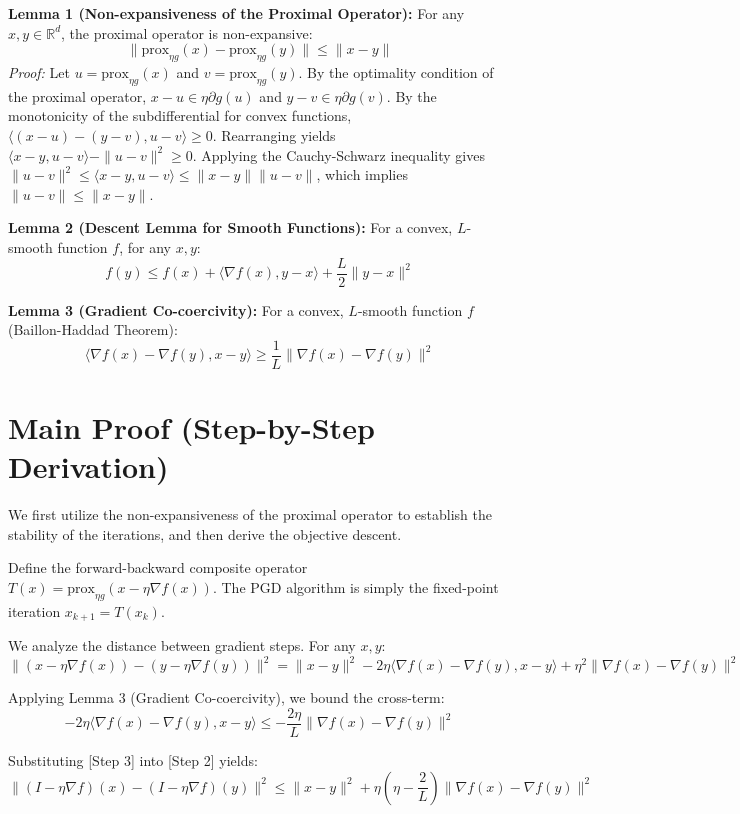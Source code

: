 \documentclass[11pt]{article}
\begin{document}
\textbf{Lemma 1 (Non-expansiveness of the Proximal Operator):} For any $x, y \in \mathbb{R}^d$, the proximal operator is non-expansive:
$$\|\text{prox}_{\eta g}(x) - \text{prox}_{\eta g}(y)\| \le \|x - y\|$$
\textit{Proof:} Let $u = \text{prox}_{\eta g}(x)$ and $v = \text{prox}_{\eta g}(y)$. By the optimality condition of the proximal operator, $x - u \in \eta \partial g(u)$ and $y - v \in \eta \partial g(v)$. By the monotonicity of the subdifferential for convex functions, $\langle (x - u) - (y - v), u - v \rangle \ge 0$. Rearranging yields $\langle x - y, u - v \rangle - \|u - v\|^2 \ge 0$. Applying the Cauchy-Schwarz inequality gives $\|u - v\|^2 \le \langle x - y, u - v \rangle \le \|x - y\| \|u - v\|$, which implies $\|u - v\| \le \|x - y\|$.

\textbf{Lemma 2 (Descent Lemma for Smooth Functions):} For a convex, $L$-smooth function $f$, for any $x, y$:
$$f(y) \le f(x) + \langle \nabla f(x), y - x \rangle + \frac{L}{2}\|y - x\|^2$$

\textbf{Lemma 3 (Gradient Co-coercivity):} For a convex, $L$-smooth function $f$ (Baillon-Haddad Theorem):
$$\langle \nabla f(x) - \nabla f(y), x - y \rangle \ge \frac{1}{L}\|\nabla f(x) - \nabla f(y)\|^2$$

\section*{Main Proof (Step-by-Step Derivation)}

We first utilize the non-expansiveness of the proximal operator to establish the stability of the iterations, and then derive the objective descent.

\noindent [Step 1] Define the forward-backward composite operator $T(x) = \text{prox}_{\eta g}(x - \eta \nabla f(x))$. The PGD algorithm is simply the fixed-point iteration $x_{k+1} = T(x_k)$.

\noindent [Step 2] We analyze the distance between gradient steps. For any $x, y$:
$$\|(x - \eta \nabla f(x)) - (y - \eta \nabla f(y))\|^2 = \|x - y\|^2 - 2\eta \langle \nabla f(x) - \nabla f(y), x - y \rangle + \eta^2 \|\nabla f(x) - \nabla f(y)\|^2$$

\noindent [Step 3] Applying Lemma 3 (Gradient Co-coercivity), we bound the cross-term:
$$-2\eta \langle \nabla f(x) - \nabla f(y), x - y \rangle \le -\frac{2\eta}{L} \|\nabla f(x) - \nabla f(y)\|^2$$

\noindent [Step 4] Substituting [Step 3] into [Step 2] yields:
$$\|(I - \eta \nabla f)(x) - (I - \eta \nabla f)(y)\|^2 \le \|x - y\|^2 + \eta\left(\eta - \frac{2}{L}\right)\|\nabla f(x) - \nabla f(y)\|^2$$
\end{document}
